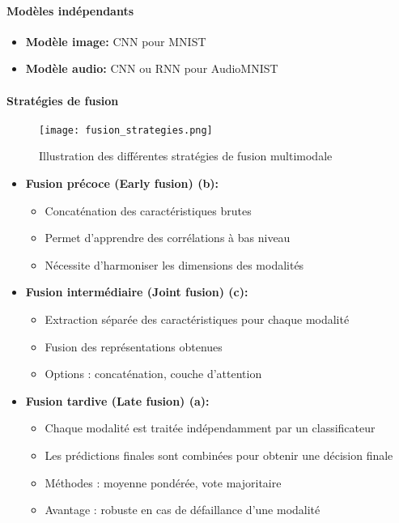 \documentclass{article}
\begin{document}
\paragraph{Modèles indépendants}
\begin{itemize}
    \item \textbf{Modèle image:} CNN pour MNIST
    \item \textbf{Modèle audio:} CNN ou RNN pour AudioMNIST
\end{itemize}
\newpage
\paragraph{Stratégies de fusion}

\begin{figure}[H]
    \centering
    \texttt{[image: fusion\_strategies.png]}
    \caption{Illustration des différentes stratégies de fusion multimodale}
    \label{fig:fusion}
\end{figure}

\begin{itemize}
    \item \textbf{Fusion précoce (Early fusion) (b):}
    \begin{itemize}
        \item Concaténation des caractéristiques brutes
        \item Permet d'apprendre des corrélations à bas niveau
        \item Nécessite d'harmoniser les dimensions des modalités
    \end{itemize}
    
    \item \textbf{Fusion intermédiaire (Joint fusion) (c):}
    \begin{itemize}
        \item Extraction séparée des caractéristiques pour chaque modalité
        \item Fusion des représentations obtenues
        \item Options : concaténation, couche d'attention
    \end{itemize}
    
    \item \textbf{Fusion tardive (Late fusion) (a):}
    \begin{itemize}
        \item Chaque modalité est traitée indépendamment par un classificateur
        \item Les prédictions finales sont combinées pour obtenir une décision finale
        \item Méthodes : moyenne pondérée, vote majoritaire
        \item Avantage : robuste en cas de défaillance d’une modalité
    \end{itemize}    
\end{itemize}
\end{document}
